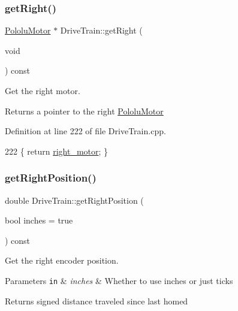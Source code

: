\subsubsection{\texorpdfstring{get\+Right()}{getRight()}}
{\footnotesize\ttfamily \hyperlink{class_pololu_motor}{Pololu\+Motor} $\ast$ Drive\+Train\+::get\+Right (\begin{DoxyParamCaption}\item[{void}]{ }\end{DoxyParamCaption}) const}



Get the right motor. 

\begin{DoxyReturn}{Returns}
a pointer to the right \hyperlink{class_pololu_motor}{Pololu\+Motor} 
\end{DoxyReturn}


Definition at line 222 of file Drive\+Train.\+cpp.


\begin{DoxyCode}
222 \{ \textcolor{keywordflow}{return} \hyperlink{class_drive_train_a499c068ddd578679ac5d654e2077fbc4}{right\_motor}; \}
\end{DoxyCode}
\mbox{\label{class_drive_train_aa52a34fcdfad88883c78b81336661137}} 
\subsubsection{\texorpdfstring{get\+Right\+Position()}{getRightPosition()}}
{\footnotesize\ttfamily double Drive\+Train\+::get\+Right\+Position (\begin{DoxyParamCaption}\item[{bool}]{inches = {\ttfamily true} }\end{DoxyParamCaption}) const}



Get the right encoder position. 


\begin{DoxyParams}[1]{Parameters}
\mbox{\tt in}  & {\em inches} & Whether to use inches or just ticks \\
\hline
\end{DoxyParams}
\begin{DoxyReturn}{Returns}
signed distance traveled since last homed 
\end{DoxyReturn}


